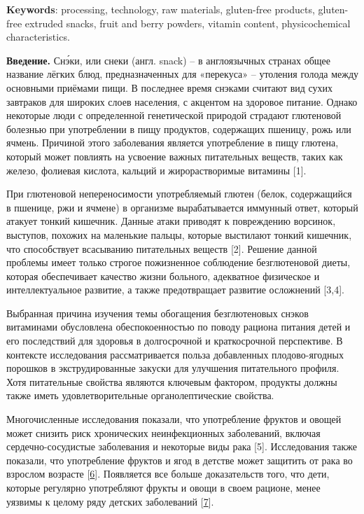{\bfseries Keywords}: processing, technology, raw materials, gluten-free
products, gluten-free extruded snacks, fruit and berry powders, vitamin
content, physicochemical characteristics.

\begin{multicols}{2}
{\bfseries Введение.} Снэ́ки, или снеки (англ. snack) -- в англоязычных
странах общее название лёгких блюд, предназначенных для «перекуса» --
утоления голода между основными приёмами пищи. В последнее время снэками
считают вид сухих завтраков для широких слоев населения, с акцентом на
здоровое питание. Однако некоторые люди с определенной генетической
природой страдают глютеновой болезнью при употреблении в пищу продуктов,
содержащих пшеницу, рожь или ячмень. Причиной этого заболевания является
употребление в пищу глютена, который может повлиять на усвоение важных
питательных веществ, таких как железо, фолиевая кислота, кальций и
жирорастворимые витамины {[}1{]}.

При глютеновой непереносимости употребляемый глютен (белок, содержащийся
в пшенице, ржи и ячмене) в организме вырабатывается иммунный ответ,
который атакует тонкий кишечник. Данные атаки приводят к повреждению
ворсинок, выступов, похожих на маленькие пальцы, которые выстилают
тонкий кишечник, что способствует всасыванию питательных веществ
{[}2{]}. Решение данной проблемы имеет только строгое пожизненное
соблюдение безглютеновой диеты, которая обеспечивает качество жизни
больного, адекватное физическое и интеллектуальное развитие, а также
предотвращает развитие осложнений {[}3,4{]}.

Выбранная причина изучения темы обогащения безглютеновых снэков
витаминами обусловлена обеспокоенностью по поводу рациона питания детей
и его последствий для здоровья в долгосрочной и краткосрочной
перспективе. В контексте исследования рассматривается польза добавленных
плодово-ягодных порошков в экструдированные закуски для улучшения
питательного профиля. Хотя питательные свойства являются ключевым
фактором, продукты должны также иметь удовлетворительные
органолептические свойства.

Многочисленные исследования показали, что употребление фруктов и овощей
может снизить риск хронических неинфекционных заболеваний, включая
сердечно-сосудистые заболевания и некоторые виды рака {[}5{]}.
Исследования также показали, что употребление фруктов и ягод в детстве
может защитить от рака во взрослом возрасте
{[}\href{https://www.sciencedirect.com/science/article/pii/S002364381200463X\#bib35}{6}{]}.
Появляется все больше доказательств того, что дети, которые регулярно
употребляют фрукты и овощи в своем рационе, менее уязвимы к целому ряду
детских заболеваний
{[}\href{https://www.sciencedirect.com/science/article/pii/S002364381200463X\#bib4}{7}{]}.


\end{multicols}
